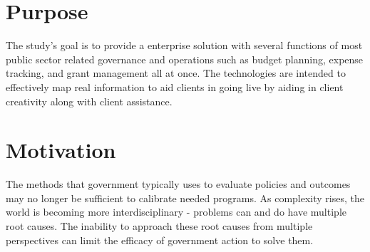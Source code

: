 \noindent{}



\section[Purpose]{\textbf{Purpose}}
The study’s goal is to provide a enterprise solution with several functions of most public sector related
governance and operations such as budget planning, expense tracking, and grant management all at once. The technologies are intended to effectively map real information to
aid clients in going live by aiding in client creativity along with client assistance.




\section[Motivation]{\textbf{Motivation}}
The methods that government typically uses to
evaluate policies and outcomes may no longer be
sufficient to calibrate needed programs. As
complexity rises, the world is becoming more
interdisciplinary - problems can and do have
multiple root causes. The inability to approach
these root causes from multiple perspectives can
limit the efficacy of government action to solve
them.


